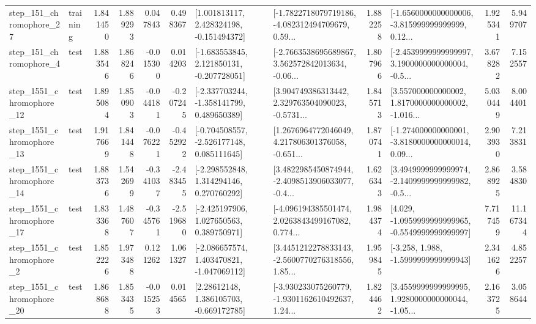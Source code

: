 \begin{tabular}{llrrrrllrlrr}
  step\_151\_chromophore\_27 &  training &      1.841450 &    1.889293 &      0.047843 &  0.498367 &    [1.001813117, 2.428324198, -0.151494372] &  [-1.7822718079719186, -4.082312494709679, 0.59... &       1.882258 &  [-1.6560000000000006, -3.815999999999999, 0.12... &            1.925341 &          5.949707 \\
   step\_151\_chromophore\_4 &      test &      1.883546 &    1.868246 &     -0.015300 &  0.014203 &   [-1.683553845, 2.121850131, -0.207728051] &  [-2.7663538695689867, 3.562572842013634, -0.06... &       1.807966 &  [-2.4539999999999997, 3.1900000000000004, -0.5... &            3.678282 &          7.152557 \\
 step\_1551\_chromophore\_12 &      test &      1.895084 &    1.850903 &     -0.044181 & -0.207245 &   [-2.337703244, -1.358141799, 0.489650389] &  [3.904749386313442, 2.329763504090023, -0.5731... &       1.845713 &  [3.557000000000002, 1.8170000000000002, -1.016... &            5.030449 &          8.004401 \\
 step\_1551\_chromophore\_13 &      test &      1.917669 &    1.841448 &     -0.076221 & -0.452922 &   [-0.704508557, -2.526177148, 0.085111645] &  [1.2676964772046049, 4.217806301376058, -0.651... &       1.870741 &  [-1.274000000000001, -3.8180000000000014, 0.09... &            2.903930 &          7.213831 \\
 step\_1551\_chromophore\_14 &      test &      1.883736 &    1.542699 &     -0.341037 & -2.483455 &    [-2.298552848, 1.314294146, 0.270760292] &  [3.4822985450874944, -2.4098513906033077, -0.4... &       1.626343 &  [3.4949999999999974, -2.1409999999999982, -0.5... &            2.868925 &          3.584830 \\
 step\_1551\_chromophore\_17 &      test &      1.833368 &    1.487607 &     -0.345761 & -2.519680 &    [-2.425197906, 1.027650563, 0.389750971] &  [-4.096194385501474, 2.0263843499167082, 0.774... &       1.984374 &  [4.029, -1.0959999999999965, -0.5549999999999997] &            7.717459 &         11.167344 \\
  step\_1551\_chromophore\_2 &      test &      1.852226 &    1.973488 &      0.121262 &  1.061327 &   [-2.086657574, 1.403470821, -1.047069112] &  [3.4451212278833143, -2.5600770276318556, 1.85... &       1.959845 &               [-3.258, 1.988, -1.5999999999999943] &            2.341626 &          4.852257 \\
 step\_1551\_chromophore\_20 &      test &      1.868688 &    1.853435 &     -0.015253 &  0.014565 &     [2.28612148, 1.386105703, -0.669172785] &  [-3.930233075260779, -1.9301162610492637, 1.24... &       1.824462 &  [3.4559999999999995, 1.9280000000000044, -1.05... &            2.163725 &          3.058644 \\

\end{tabular}
